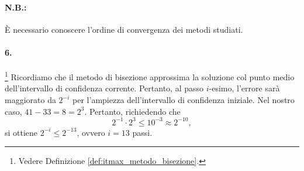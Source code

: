 \paragraph{N.B.:} È necessario conoscere l'ordine di convergenza dei metodi studiati.

\paragraph{6. }\footnote{Vedere Definizione \ref{def:itmax_metodo_bisezione}.} Ricordiamo che il metodo di bisezione approssima la soluzione col punto medio dell'intervallo di confidenza corrente. Pertanto, al passo $i$-esimo, l'errore sarà maggiorato da $2^{-i}$ per l'ampiezza dell'intervallo di confidenza iniziale. Nel nostro caso, $41-33=8=2^3$. Pertanto, richiedendo che
\begin{equation*}
	2^{-1}\cdot 2^3\leq 10^{-3}\approx 2^{-10},
\end{equation*}
si ottiene $2^{-i}\leq 2^{-13}$, ovvero $i=13$ passi.


